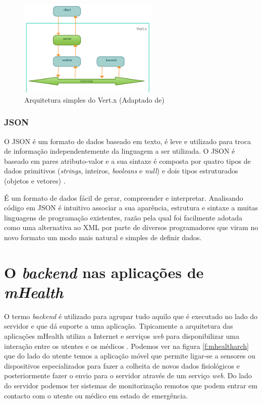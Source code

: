 \begin{figure}[H]
  \centering
  \includegraphics[width=0.6\textwidth]{imgs/vertx_arch.png}
  \caption[Arquitetura simples do Vert.x]{Arquitetura simples do Vert.x (Adaptado de\cite{vertx-study})}
  \label{f:vertxarch}
\end{figure}


\subsubsection{JSON}
O \gls{JSON} é um formato de dados baseado em texto, é leve e utilizado para troca de informação independentemente da linguagem a ser utilizada. O \gls{JSON} é baseado em pares atributo-valor e a sua sintaxe é composta por quatro tipos de dados primitivos (\textit{strings}, inteiros, \textit{booleans} e \textit{null}) e dois tipos estruturados (objetos e vetores) \cite{json}. 
\par
É um formato de dados  fácil de gerar, compreender e interpretar. Analisando código em \gls{JSON} é intuitivo associar a sua aparência, estrutura e sintaxe a muitas linguagens de programação existentes, razão pela qual foi facilmente adotada como uma alternativa ao \gls{XML} por parte de diversos programadores que viram no novo formato um modo mais natural e simples de definir dados.



\newpage
\section{O \textit{backend} nas aplicações de \textit{mHealth}}
O termo \textit{backend} é utilizado para agrupar tudo aquilo que é executado no lado do servidor e que dá suporte a uma aplicação. Tipicamente a arquitetura das aplica\c c\~oes mHealth utiliza a Internet e serviços \textit{web} para disponibilizar uma intera\c c\~ao entre os utentes e os m\'edicos \cite{mhealth}. Podemos ver na figura \ref{f:mhealtharch} que do lado do utente temos a aplicação móvel que permite ligar-se a sensores ou dispositivos especializados para fazer a colheita de novos dados fisiológicos e posteriormente fazer o envio para o servidor através de um serviço \textit{web}. Do lado do servidor podemos ter sistemas de monitorização remotos que podem entrar em contacto com o utente ou médico em estado de emergência.

